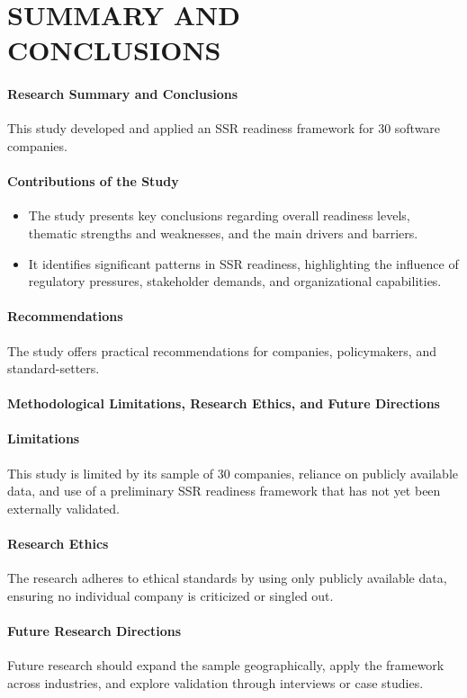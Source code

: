 \chapter{SUMMARY AND CONCLUSIONS}

\subsubsection{Research Summary and Conclusions}
This study developed and applied an SSR readiness framework for 30 software companies.

\subsubsection{Contributions of the Study}

\begin{itemize}
    \item The study presents key conclusions regarding overall readiness levels, 
    thematic strengths and weaknesses, and the main drivers and barriers.
    \item It identifies significant patterns in SSR readiness, highlighting 
    the influence of regulatory pressures, stakeholder demands, and organizational capabilities.
\end{itemize}


\subsubsection{Recommendations}
The study offers practical recommendations for companies, policymakers, and standard-setters.

\subsubsection{Methodological Limitations, Research Ethics, and Future Directions}
\subsubsection{Limitations}
This study is limited by its sample of 30 companies, reliance on publicly available data, 
and use of a preliminary SSR readiness framework that has not yet been externally validated.

\subsubsection{Research Ethics}
The research adheres to ethical standards by using only publicly available data, 
ensuring no individual company is criticized or singled out.

\subsubsection{Future Research Directions}
Future research should expand the sample geographically, apply the framework across industries, 
and explore validation through interviews or case studies.